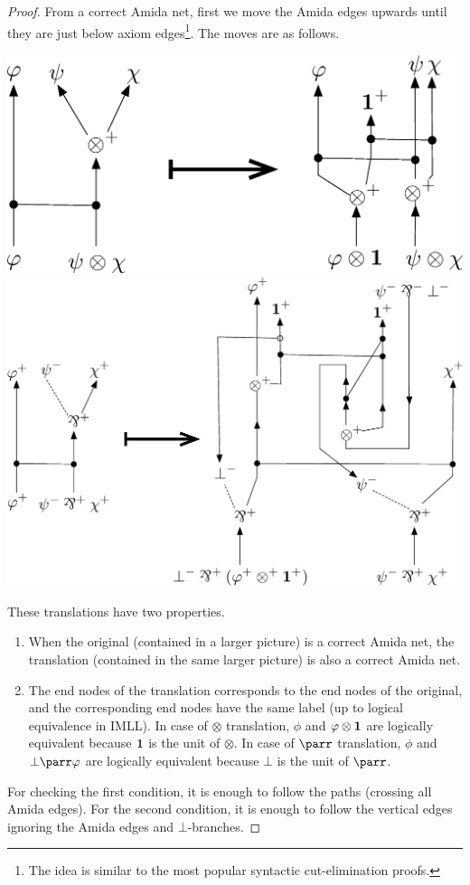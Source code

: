  \begin{proof}
  From a correct Amida net, first we move the Amida edges upwards
  until they are just below axiom edges\footnote{The idea is similar to
  the most popular syntactic
  cut-elimination proofs.}.
The moves are as follows.
 \begin{center}
\includegraphics[scale=0.4]{tensor-move.eps}
\vskip 3cm
\includegraphics[scale=0.35]{parr-move.eps}
 \end{center}
These translations have two properties.
\begin{enumerate}
 \item When the original (contained in a larger picture)
       is a correct Amida net, the translation (contained in the same
       larger picture) is also a correct Amida net.
 \item The end nodes of the translation corresponds to the end nodes of
       the original, and the corresponding end nodes have the same label
       (up to logical equivalence in IMLL).  In case of $\otimes$
       translation, $\phi$ and
       $\varphi\otimes \mathbf{1}$ are logically equivalent because $\mathbf{1}$ is the
       unit of $\otimes$.
       In case of $\parr$ translation, $\phi$ and $\bot\parr \phi$ are
       logically equivalent because $\bot$ is the unit of $\parr$.
\end{enumerate}
For checking the first condition, it is enough to follow the paths
(crossing all Amida edges).
For the second condition, it is enough to follow the vertical edges
ignoring the Amida edges and $\bot$-branches.


\end{proof}
